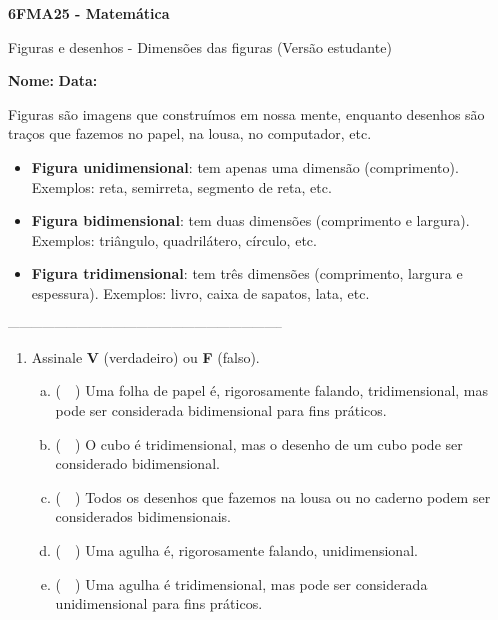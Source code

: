 \documentclass[a4paper,14pt]{article}
\begin{document}
	
	\noindent\textbf{6FMA25 - Matemática} 
	
	\begin{center}Figuras e desenhos - Dimensões das figuras (Versão estudante)
	\end{center}
	
	\noindent\textbf{Nome:} \underline{\hspace{10cm}}
	\noindent\textbf{Data:} \underline{\hspace{4cm}}
	
	
	\begin{multicols}{2}
		\noindent Figuras são imagens que construímos em nossa mente, enquanto desenhos são traços que fazemos no papel, na lousa, no computador, etc. \\
		\begin{itemize}
			\item \textbf{Figura unidimensional}: tem apenas uma dimensão (comprimento). Exemplos: reta, semirreta, segmento de reta, etc.
			\item \textbf{Figura bidimensional}: tem duas dimensões (comprimento e largura). Exemplos: triângulo, quadrilátero, círculo, etc.
			\item \textbf{Figura tridimensional}: tem três dimensões (comprimento, largura e espessura). Exemplos: livro, caixa de sapatos, lata, etc.
		\end{itemize}
		\noindent\textsubscript{-----------------------------------------------------------------------}
		\begin{enumerate} 
			\item Assinale \textbf{V} (verdadeiro) ou \textbf{F} (falso).
			\begin{enumerate}[a)]
				\item (~~) Uma folha de papel é, rigorosamente falando, tridimensional, mas pode ser considerada bidimensional para fins práticos.
				\item (~~) O cubo é tridimensional, mas o desenho de um cubo pode ser considerado bidimensional.
				\item (~~) Todos os desenhos que fazemos na lousa ou no caderno podem ser considerados bidimensionais.
				\item (~~) Uma agulha é, rigorosamente falando, unidimensional.
				\item (~~) Uma agulha é tridimensional, mas pode ser considerada unidimensional para fins práticos.

\end{enumerate}
\end{enumerate}
\end{multicols}
\end{document}
